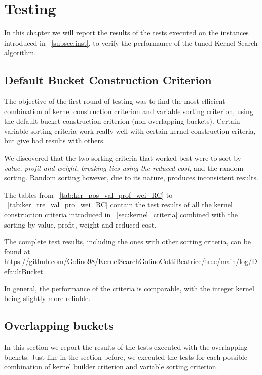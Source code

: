 \chapter{Testing}\label{ch:testing}
In this chapter we will report the results of the tests executed
on the instances introduced in ~\ref{subsec:inst},
to verify the performance of the tuned Kernel Search algorithm.


\section{Default Bucket Construction Criterion}
The objective of the first round of testing was to find the most efficient
combination of kernel construction criterion and variable sorting criterion,
using the default bucket construction criterion (non-overlapping buckets).
Certain variable sorting criteria work really well with certain kernel construction criteria,
but give bad results with others.

We discovered that the two sorting criteria that
worked best were to sort by \textit{value, profit and weight, breaking ties using the reduced cost},
and the random sorting.
Random sorting however, due to its nature, produces inconsistent results.

The tables from ~\ref{tab:ker_pos_val_prof_wei_RC}
to ~\ref{tab:ker_tre_val_pro_wei_RC} contain the test results of all the
kernel construction criteria introduced in ~\ref{sec:kernel_criteria}
combined with the sorting by value, profit, weight and reduced cost.

The complete test results, including the ones with other sorting criteria, can be found at
\url{https://github.com/Golino98/KernelSearchGolinoCottiBeatrice/tree/main/log/DefaultBucket}.

In general, the performance of the criteria is comparable,
with the integer kernel being slightly more reliable.







\section{Overlapping buckets}
In this section we report the results of the tests executed with the overlapping buckets.
Just like in the section before, we executed the tests for each possible combination
of kernel builder criterion and variable sorting criterion.


